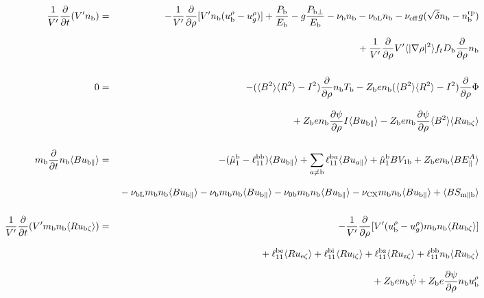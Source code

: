 \documentclass[11pt]{article}
\def\r#1{{\rm#1}}
\def\aves#1{\langle#1\rangle}
\def\dd#1#2{\frac{\partial #1}{\partial #2}}
\def\para{\parallel}
\def\ddrho{\frac{\partial}{\partial\rho}}
\def\ddV{\frac{\partial}{\partial V}}
\def\ddt{\frac{\partial}{\partial t}}
\def\mb{m_\r{b}}
\def\ni{n_\r{i}}
\def\nb{n_\r{b}}
\def\Tb{T_\r{b}}
\def\Zb{Z_\r{b}}
\def\uzt#1{u_{\r{#1}\zeta}}
\def\upara#1{u_{\r{#1}\para}}
\def\qhatpara#1{\hat{q}_{\r{#1}\para}}
\def\urho#1{u_\r{#1}^\rho}
\def\ugrho{u_{g}^\rho}
\def\chis#1{\chi_\r{#1}}
\def\nun#1{\nu_\r{0#1}}
\def\nbrp{n_\r{b}^\r{rp}}
\def\Db{D_\r{b}}
\def\bri{\aves{B^2}\aves{R^2} - I^2}
\def\Pbpara{P_{\r{b}\parallel}}
\def\Pbperp{P_{\r{b}\perp}}
\def\Pb{P_\r{b}}
\def\Eb{E_\r{b}}
\def\nueff{\nu_\r{eff}}
\def\nuCX{\nu_\r{CX}}
\def\nub{\nu_\r{b}}
\def\nubL{\nu_\r{bL}}
\def\red#1{\textcolor{red}{#1}}
\begin{document}
%
\begin{eqnarray}
  \frac{1}{V'} \ddt (V' \nb) &=&
%
  - \frac{1}{V'} \ddrho [ V' \nb (\urho{b} - \ugrho) ]
%
  + \frac{\Pb}{\Eb}
%
  - g \frac{\Pbperp}{\Eb}
%
  - \nub \nb
%
  - \nubL \nb
%
  - \nueff g (\sqrt{\delta} \nb - \nbrp)
%
\nonumber\\[2.5mm]&&{}
  + \frac{1}{V'} \ddrho V'\aves{|\nabla\rho|^2} f_t \Db \ddrho \nb
%
\\[5mm]
  0 &=&
%
  -           ( \bri ) \ddrho \nb \Tb
%
  - \Zb e \nb ( \bri ) \ddrho \Phi
\nonumber\\[3mm]&&{}
%
  + \Zb e \nb \dd{\psi}{\rho} I          \aves{B\upara{b}}
%
  - \Zb e \nb \dd{\psi}{\rho} \aves{B^2} \aves{R\uzt{b}}
\\[5mm]
  \mb \ddt \nb \aves{B \upara{b}} &=&
%
  - (\hat{\mu}_1^\r{b} - \ell_{11}^\r{bb}) \aves{B \upara{b}}
%
  + \sum_{a\neq\r{b}} \ell_{11}^{\r{b}a} \aves{B u_{a\para}}
%
  + \hat{\mu}_1^\r{b} {B V_{1\r{b}}}
%
  + \Zb e \nb \aves{B E_\para^A}
\nonumber\\[2.5mm]&&{}
%
  - \nubL \mb \nb \aves{B\upara{b}}
%
  - \nub  \mb \nb \aves{B\upara{b}}
%
  - \nun{b} \mb \nb \aves{B\upara{b}}
%
  - \nuCX \mb \nb \aves{B\upara{b}}
%
  + \aves{B S_{\r{m}\para\r{b}}}
%
%
\\[5mm]
  \frac{1}{V'} \ddt (V' \mb \nb \aves{R \uzt{b}}) &=&
%
  - \frac{1}{V'} \dd{}{\rho}[ V' (\urho{b} - \ugrho) \mb \nb \aves{R \uzt{b}} ]
%
\nonumber\\[2.5mm]&&{}
%
  + \ell_{11}^\r{be} \aves{R \uzt{e}}
  + \ell_{11}^\r{bi} \aves{R \uzt{i}}
  + \ell_{11}^\r{bz} \aves{R \uzt{z}}
  + \ell_{11}^\r{bb} \nb \aves{R \uzt{b}}
\nonumber\\[2.5mm]&&{}
%
%
  + \Zb e              \nb \dot{\psi}
%
  + \Zb e \dd{\psi}{\rho} \nb \urho{b}
%

\end{eqnarray}
\end{document}
